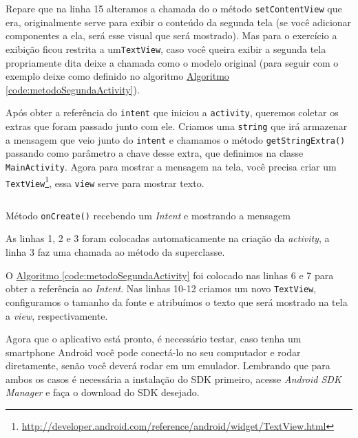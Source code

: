 \documentclass[a4paper,12pt,brazil,oneside]{book}
\begin{document}
Repare que na linha 15 alteramos a chamada do o método \texttt{setContentView} que era, originalmente serve para exibir o conteúdo da segunda tela (se você adicionar componentes a ela, será esse visual que será mostrado). Mas para o exercício a exibição ficou restrita a um\texttt{TextView}, caso você queira exibir a segunda tela propriamente dita deixe a chamada como o modelo original (para seguir com o exemplo deixe como definido no algoritmo \hyperref[code:metodoSegundaActivity]{Algoritmo \ref*{code:metodoSegundaActivity}}).

Após obter a referência do \texttt{intent} que iniciou a \texttt{activity}, queremos coletar os extras que foram passado junto com ele. Criamos uma \texttt{string} que irá armazenar a mensagem que veio junto do \texttt{intent} e chamamos o método \texttt{getStringExtra()} passando como parâmetro a chave desse extra, que definimos na classe \texttt{MainActivity}. 
Agora para mostrar a mensagem na tela, você precisa criar um \texttt{TextView}\footnote{\href{http://developer.android.com/reference/android/widget/TextView.html}{http://developer.android.com/reference/android/widget/TextView.html}}, essa \texttt{view} serve para mostrar texto. 


\begin{listing}[H]
\inputminted[linenos=true,fontsize=\small,frame=lines, framesep=2mm, tabsize=2,numbersep=5pt]{java}{src/firstapp/9.java}
\caption{Método \texttt{onCreate()} recebendo um \emph{Intent} e mostrando a mensagem}
\label{code:metodoSegundaActivity}
\end{listing}

As linhas 1, 2 e 3 foram colocadas automaticamente na criação da \emph{activity}, a linha 3 faz uma chamada ao método da superclasse.

O \hyperref[code:metodoSegundaActivity]{Algoritmo \ref*{code:metodoSegundaActivity}} foi colocado nas linhas 6 e 7 para obter a referência ao \emph{Intent}. Nas linhas 10-12 criamos um novo \texttt{TextView}, configuramos o tamanho da fonte e atribuímos o texto que será mostrado na tela a \emph{view}, respectivamente. 

\newpage

Agora que o aplicativo está pronto, é necessário testar, caso tenha um smartphone Android você pode conectá-lo no seu computador e rodar diretamente, senão você deverá rodar em um emulador. Lembrando que para ambos os casos é necessária a instalação do SDK primeiro, acesse \emph{Android SDK Manager} e faça o download do SDK desejado.
\end{document}
